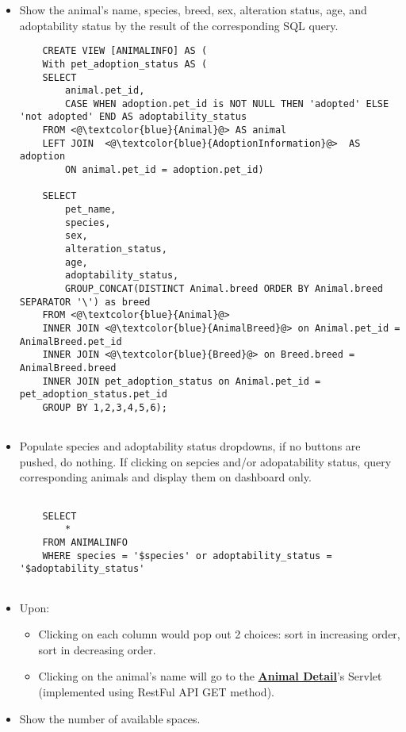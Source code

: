\documentclass[a4paper]{article}
\begin{document}
\begin{itemize}
	\item Show the animal’s name, species, breed, sex, alteration status, age, and adoptability status by the result of the corresponding SQL query.
	\begin{lstlisting}
	CREATE VIEW [ANIMALINFO] AS (
	With pet_adoption_status AS (
	SELECT 
	    animal.pet_id, 
	    CASE WHEN adoption.pet_id is NOT NULL THEN 'adopted' ELSE 'not adopted' END AS adoptability_status
	FROM <@\textcolor{blue}{Animal}@> AS animal
	LEFT JOIN  <@\textcolor{blue}{AdoptionInformation}@>  AS adoption
	    ON animal.pet_id = adoption.pet_id)
    
    SELECT 
	    pet_name, 
	    species, 
	    sex, 
	    alteration_status, 
	    age,
	    adoptability_status,
	    GROUP_CONCAT(DISTINCT Animal.breed ORDER BY Animal.breed SEPARATOR '\') as breed
	FROM <@\textcolor{blue}{Animal}@> 
	INNER JOIN <@\textcolor{blue}{AnimalBreed}@> on Animal.pet_id = AnimalBreed.pet_id
    INNER JOIN <@\textcolor{blue}{Breed}@> on Breed.breed = AnimalBreed.breed
    INNER JOIN pet_adoption_status on Animal.pet_id = pet_adoption_status.pet_id
    GROUP BY 1,2,3,4,5,6);
	
	\end{lstlisting}
	\item Populate species and adoptability status dropdowns, if no buttons are pushed, do nothing. If clicking on sepcies and/or adopatability status, query corresponding animals and display them on dashboard only.
	
	\begin{lstlisting}
	
    SELECT 
	    *
	FROM ANIMALINFO
	WHERE species = '$species' or adoptability_status = '$adoptability_status'
	
	\end{lstlisting}
	
	

	\item Upon: \begin{itemize}
		\item Clicking on each column would pop out 2 choices: sort in increasing order, sort in decreasing order.
		\item Clicking on the animal's name will go to the \underline{\textbf{Animal Detail}}'s Servlet (implemented using RestFul API GET method).
	\end{itemize}
	\item Show the number of available spaces.
	\begin{lstlisting}
	

\end{lstlisting}
\end{itemize}
\end{document}
